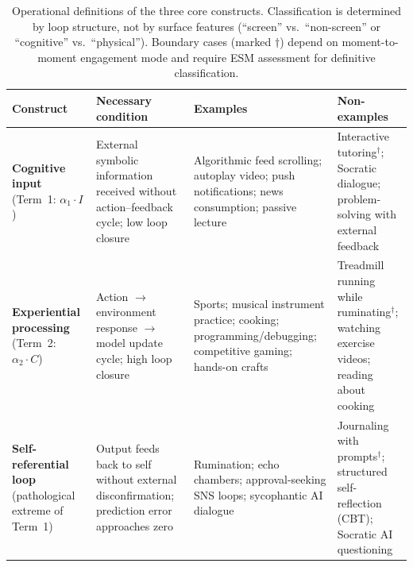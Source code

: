 \documentclass[a4paper,11pt,titlepage]{article}
\begin{document}
\begin{table}[htbp]
\centering
\caption{Operational definitions of the three core constructs. Classification is determined by loop structure, not by surface features (``screen'' vs.\ ``non-screen'' or ``cognitive'' vs.\ ``physical''). Boundary cases (marked $\dagger$) depend on moment-to-moment engagement mode and require ESM assessment for definitive classification.}
\label{tab:operational-defs}
\small
\begin{tabular}{p{2.2cm}p{3.2cm}p{3.5cm}p{3.5cm}}
\toprule
\textbf{Construct} & \textbf{Necessary condition} & \textbf{Examples} & \textbf{Non-examples} \\
\midrule
\textbf{Cognitive input} (Term~1: $\alpha_1 \cdot I$) &
  External symbolic information received without action--feedback cycle; low loop closure &
  Algorithmic feed scrolling; autoplay video; push notifications; news consumption; passive lecture &
  Interactive tutoring$^\dagger$; Socratic dialogue; problem-solving with external feedback \\
\addlinespace
\textbf{Experiential processing} (Term~2: $\alpha_2 \cdot C$) &
  Action $\to$ environment response $\to$ model update cycle; high loop closure &
  Sports; musical instrument practice; cooking; programming/debugging; competitive gaming; hands-on crafts &
  Treadmill running while ruminating$^\dagger$; watching exercise videos; reading about cooking \\
\addlinespace
\textbf{Self-referential loop} (pathological extreme of Term~1) &
  Output feeds back to self without external disconfirmation; prediction error approaches zero &
  Rumination; echo chambers; approval-seeking SNS loops; sycophantic AI dialogue &
  Journaling with prompts$^\dagger$; structured self-reflection (CBT); Socratic AI questioning \\
\bottomrule
\end{tabular}
\end{table}
\end{document}
